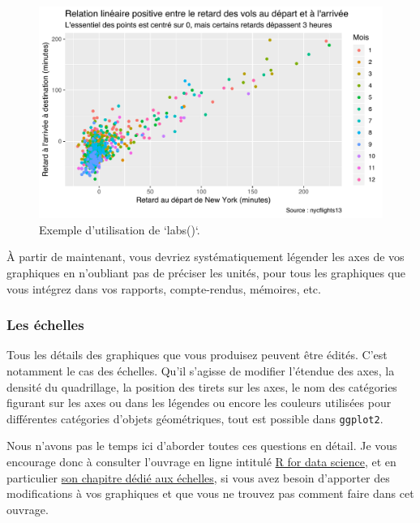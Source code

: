 \documentclass[a4paperpaper,]{article}
\begin{document}
\begin{figure}[htpb]

{\centering \includegraphics[width=0.9\linewidth]{figure/varcolorlabel2-1} 

}

\caption{Exemple d'utilisation de `labs()`.}\label{fig:varcolorlabel2}
\end{figure}

À partir de maintenant, vous devriez systématiquement légender les axes de vos graphiques en n'oubliant pas de préciser les unités, pour tous les graphiques que vous intégrez dans vos rapports, compte-rendus, mémoires, etc.

\hypertarget{les-echelles}{%
\subsubsection{Les échelles}\label{les-echelles}}

Tous les détails des graphiques que vous produisez peuvent être édités. C'est notamment le cas des échelles. Qu'il s'agisse de modifier l'étendue des axes, la densité du quadrillage, la position des tirets sur les axes, le nom des catégories figurant sur les axes ou dans les légendes ou encore les couleurs utilisées pour différentes catégories d'objets géométriques, tout est possible dans \texttt{ggplot2}.

Nous n'avons pas le temps ici d'aborder toutes ces questions en détail. Je vous encourage donc à consulter l'ouvrage en ligne intitulé \href{http://r4ds.had.co.nz/}{R for data science}, et en particulier \href{http://r4ds.had.co.nz/graphics-for-communication.html\#scales}{son chapitre dédié aux échelles}, si vous avez besoin d'apporter des modifications à vos graphiques et que vous ne trouvez pas comment faire dans cet ouvrage.
\end{document}
